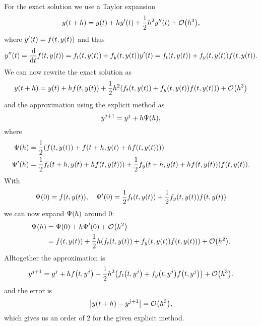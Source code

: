 \documentclass{exercise}
\begin{document}
	For the exact solution we use a Taylor expansion
	\[
		y\parentheses*{t + h} = y\parentheses*{t} + hy'\parentheses*{t} + \frac{1}{2}h^2 y''\parentheses*{t} + \mathcal{O}\parentheses*{h^3},
	\]
	where \(y'\parentheses*{t} = f\parentheses*{t, y\parentheses*{t}}\) and thus
	\[
		y''\parentheses*{t} = \frac{\d}{\d t}f\parentheses*{t, y\parentheses*{t}} = f_t\parentheses*{t, y\parentheses*{t}} + f_y\parentheses*{t, y\parentheses*{t}}y'\parentheses*{t} = f_t\parentheses*{t, y\parentheses*{t}} + f_y\parentheses*{t, y\parentheses*{t}}f\parentheses*{t, y\parentheses*{t}}.
	\]
	We can now rewrite the exact solution as
	\[
		y\parentheses*{t + h} = y\parentheses*{t} + hf\parentheses*{t, y\parentheses*{t}} + \frac{1}{2}h^2 \parentheses*{f_t\parentheses*{t, y\parentheses*{t}} + f_y\parentheses*{t, y\parentheses*{t}}f\parentheses*{t, y\parentheses*{t}}} + \mathcal{O}\parentheses*{h^3}
	\]
	and the approximation using the explicit method as
	\[
		y^{j + 1} = y^j + h\Psi\parentheses*{h},
	\]
	where
	\begin{align*}
		\Psi\parentheses*{h} &= \frac{1}{2}\parentheses*{f\parentheses*{t, y\parentheses*{t}} + f\parentheses*{t + h, y\parentheses*{t} + hf\parentheses*{t, y\parentheses*{t}}}}\\
		\Psi'\parentheses*{h} &= \frac{1}{2}f_t\parentheses*{t + h, y\parentheses*{t} + hf\parentheses*{t, y\parentheses*{t}}} + \frac{1}{2}f_y\parentheses*{t + h, y\parentheses*{t} + hf\parentheses*{t, y\parentheses*{t}}}f\parentheses*{t, y\parentheses*{t}}.
	\end{align*}
	With
	\[
		\Psi\parentheses*{0} = f\parentheses*{t, y\parentheses*{t}}, \quad \Psi'\parentheses*{0} = \frac{1}{2}f_t\parentheses*{t, y\parentheses*{t}} + \frac{1}{2}f_y\parentheses*{t, y\parentheses*{t}}f\parentheses*{t, y\parentheses*{t}}
	\]
	we can now expand \(\Psi\parentheses*{h}\) around \(0\):
	\begin{align*}
		\Psi\parentheses*{h} &= \Psi\parentheses*{0} + h\Psi'\parentheses*{0} + \mathcal{O}\parentheses*{h^2}\\
		&= f\parentheses*{t, y\parentheses*{t}} + \frac{1}{2}h\parentheses*{f_t\parentheses*{t, y\parentheses*{t}} + f_y\parentheses*{t, y\parentheses*{t}}f\parentheses*{t, y\parentheses*{t}}} + \mathcal{O}\parentheses*{h^2}.
	\end{align*}
	Alltogether the approximation is
	\[
		y^{j + 1} = y^j + hf\parentheses*{t, y^j} + \frac{1}{2}h^2 \parentheses*{f_t\parentheses*{t, y^j} + f_y\parentheses*{t, y^j}f\parentheses*{t, y^j}} + \mathcal{O}\parentheses*{h^3}.
	\]
	and the error is
	\[
		\absolute*{y\parentheses*{t + h} - y^{j + 1}} = \mathcal{O}\parentheses*{h^3},
	\]
	which gives us an order of \(2\) for the given explicit method.
\end{document}
